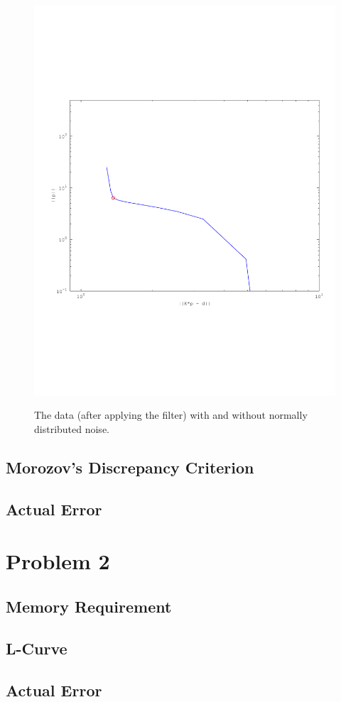\documentclass{article}
\begin{document}
\begin{figure}[!htb]
  \includegraphics[scale=.5]{plots/L-curve.pdf}
  \label{fig:data}
  \caption{The data (after applying the filter) with and without
 normally distributed noise. } 
\end{figure}


\subsection{Morozov's Discrepancy Criterion}


\subsection{Actual Error}


\newpage
\section{Problem 2}


\subsection{Memory Requirement}


\subsection{L-Curve}


\subsection{Actual Error}
\end{document}
